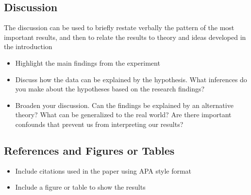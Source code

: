 \subsection{Discussion}

The discussion can be used to briefly restate verbally the pattern of the most important results, and then to relate the results to theory and ideas developed in the introduction

\begin{itemize}
\item Highlight the main findings from the experiment
\item Discuss how the data can be explained by the hypothesis. What inferences do you make about the hypotheses based on the research findings?
\item Broaden your discussion. Can the findings be explained by an alternative theory? What can be generalized to the real world? Are there important confounds that prevent us from interpreting our results?
\end{itemize}

\subsection{References and Figures or Tables}

\begin{itemize}
\item Include citations used in the paper using APA style format
\item Include a figure or table to show the results
\end{itemize}





